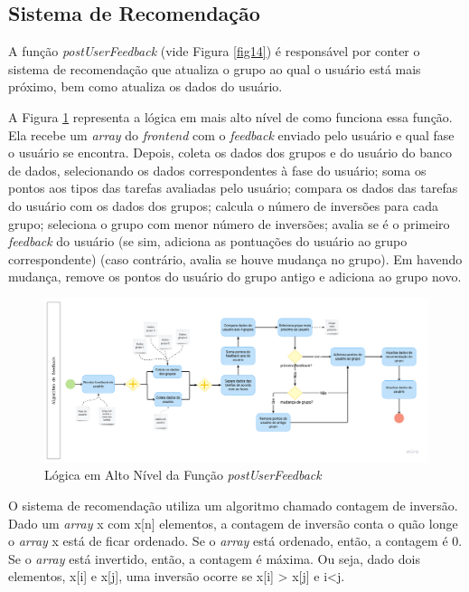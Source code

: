 \subsection{Sistema de Recomendação}
\label{sr}

A função \emph{postUserFeedback} (vide Figura \ref{fig14}) é responsável por conter o sistema de 
recomendação que atualiza o grupo ao qual o usuário está mais próximo, bem como atualiza os dados do usuário. 

A Figura \ref{fig15} representa a lógica em mais alto nível de como funciona essa função. Ela recebe 
um \emph{array} do \emph{frontend} com o \emph{feedback} enviado pelo usuário e qual fase o usuário se encontra. 
Depois, coleta os dados dos grupos e do usuário do banco de dados, selecionando os dados correspondentes à fase 
do usuário; soma os pontos aos tipos das tarefas avaliadas pelo usuário; compara os dados das tarefas do usuário 
com os dados dos grupos; calcula o número de inversões para cada grupo; seleciona o grupo com menor 
número de inversões; avalia se é o primeiro \emph{feedback} do usuário (se sim, adiciona as pontuações do usuário ao grupo correspondente) 
(caso contrário, avalia se houve mudança no grupo). Em havendo mudança, remove os pontos do usuário do grupo antigo e adiciona ao grupo novo. 

\begin{figure}[ht]
	\caption{Lógica em Alto Nível da Função \emph{postUserFeedback }}
	\begin{center}
	\includegraphics[keepaspectratio=true,scale=0.14]{figuras/recomendacao.png}
	\end{center}
    \label{fig15}
\end{figure}

O sistema de recomendação utiliza um algoritmo chamado contagem de inversão. 
Dado um \emph{array} x com x[n] elementos, a contagem de inversão conta o quão longe o \emph{array} x está de ficar 
ordenado. Se o \emph{array} está ordenado, então, a contagem é 0. Se o \emph{array} está invertido, 
então, a contagem é máxima. Ou seja, dado dois elementos, x[i] e x[j], uma 
inversão ocorre se x[i] > x[j] e i<j.

